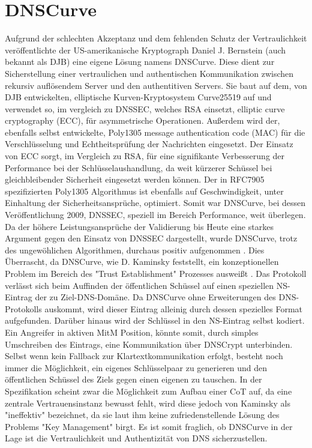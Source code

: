 \section{DNSCurve}

Aufgrund der schlechten Akzeptanz und dem fehlenden Schutz der Vertraulichkeit veröffentlichte der US-amerikanische Kryptograph Daniel J. Bernstein (auch bekannt als DJB) eine eigene Lösung namens DNSCurve. Diese dient zur Sicherstellung einer vertraulichen und authentischen Kommunikation zwischen rekursiv auflösendem Server und den authentitiven Servers. Sie baut auf dem, von DJB entwickelten, elliptische Kurven-Kryptosystem Curve25519 auf und verwendet so, im vergleich zu DNSSEC, welches RSA einsetzt, elliptic curve cryptography (ECC), für asymmetrische Operationen. Außerdem wird der, ebenfalls selbst entwickelte, Poly1305 message authentication code (MAC) für die Verschlüsselung und Echtheitsprüfung der Nachrichten eingesetzt. Der Einsatz von ECC sorgt, im Vergleich zu RSA, für eine signifikante Verbesserung der Performance bei der Schlüsselaushandlung, da weit kürzerer Schüssel bei gleichbleibender Sicherheit eingesetzt werden können\cite{Gupta2002}. Der in RFC7905 spezifizierten Poly1305 Algorithmus ist ebenfalls auf Geschwindigkeit, unter Einhaltung der Sicherheitsansprüche, optimiert\cite{Bernstein2005}. Somit war DNSCurve, bei dessen Veröffentlichung 2009, DNSSEC, speziell im Bereich Performance, weit überlegen. Da der höhere Leistungsansprüche der Validierung bis Heute eine starkes Argument gegen den Einsatz von DNSSEC dargestellt, wurde DNSCurve, trotz des ungewöhlichen Algorithmen, durchaus positiv aufgenommen \cite{Henry2013}. Dies Überrascht, da DNSCurve, wie D. Kaminsky feststellt, ein konzeptionellen Problem im Bereich des "Trust Establishment" Prozesses ausweißt \cite{Kaminsky2011}. Das Protokoll verlässt sich beim Auffinden der öffentlichen Schüssel auf einen speziellen NS-Eintrag der zu Ziel-DNS-Domäne. Da DNSCurve ohne Erweiterungen des DNS-Protokolls auskommt, wird dieser Eintrag alleinig durch dessen spezielles Format aufgefunden. Darüber hinaus wird der Schlüssel in den NS-Eintrag selbst kodiert. Ein Angreifer in aktiven MitM Position, könnte somit, durch simples Umschreiben des Eintrags, eine Kommunikation über DNSCrypt unterbinden. Selbst wenn kein Fallback zur Klartextkommunikation erfolgt, besteht noch immer die Möglichkeit, ein eigenes Schlüsselpaar zu generieren und den öffentlichen Schüssel des Ziels gegen einen eigenen zu tauschen. In der Spezifikation scheint zwar die Möglichkeit zum Aufbau einer CoT auf, da eine zentrale Vertrauensinstanz bewusst fehlt, wird diese jedoch von Kaminsky als "ineffektiv" bezeichnet, da sie laut ihm keine zufriedenstellende Lösung des Problems "Key Management" birgt. Es ist somit fraglich, ob DNSCurve in der Lage ist die Vertraulichkeit und Authentizität von DNS sicherzustellen.


